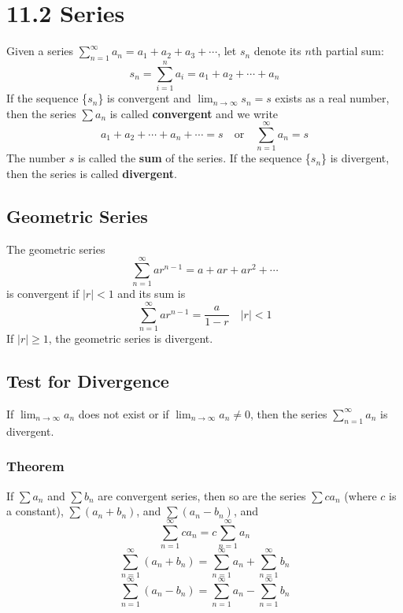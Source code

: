%
%

\section*{11.2 Series}

Given a series \(\sum_{n=1}^{\infty}{a_n} = a_1 + a_2 + a_3 + \cdots\), let \(s_n\) denote its \(n\)th partial sum:
\[ s_n = \sum_{i=1}^n{a_i} = a_1 + a_2 + \cdots + a_n \]
If the sequence \{\(s_n\)\} is convergent and \(\lim_{n \to \infty}{s_n} = s\) exists as a real number, then the series \(\sum{a_n}\) is called \textbf{convergent} and we write
\[ a_1 + a_2 + \cdots + a_n + \cdots = s \quad \text{or} \quad \sum_{n=1}^{\infty}{a_n} = s \]
The number \(s\) is called the \textbf{sum} of the series. If the sequence \{\(s_n\)\} is divergent, then the series is called \textbf{divergent}.

\subsection*{Geometric Series}

The geometric series
\[ \sum_{n=1}^{\infty}{ar^{n-1}} = a + ar + ar^2 + \cdots \]
is convergent if \(|r| < 1\) and its sum is
\[ \sum_{n=1}^{\infty}{ar^{n-1}} = \frac{a}{1-r} \quad |r| < 1\]
If \(|r| \geq 1\), the geometric series is divergent.

\subsection*{Test for Divergence}

If \(\lim_{n \to \infty}{a_n}\) does not exist or if \( \lim_{n \to \infty}{a_n}
\neq 0\), then the series \(\sum_{n=1}^{\infty}{a_n}\) is divergent.

\subsubsection*{Theorem}

If \(\sum{a_n}\) and \(\sum{b_n}\) are convergent series, then so are the series \(\sum{c a_n}\) (where \(c\) is a constant), \(\sum{(a_n + b_n)}\), and \(\sum{(a_n - b_n)}\), and
\[ \sum_{n=1}^{\infty}{c a_n} = c \sum_{n=1}^{\infty}{a_n} \]
\[ \sum_{n=1}^{\infty}{(a_n + b_n)} = \sum_{n=1}^{\infty}{a_n} + \sum_{n=1}^{\infty}{b_n} \]
\[ \sum_{n=1}^{\infty}{(a_n - b_n)} = \sum_{n=1}^{\infty}{a_n} - \sum_{n=1}^{\infty}{b_n} \]

